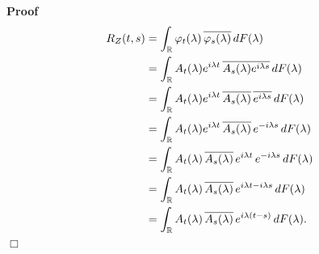 \documentclass{article}
\newenvironment{proof}{\noindent\textbf{Proof\ }}{\hspace*{\fill}$\Box$\medskip}
\begin{document}
\begin{proof}
  \begin{align*}
    R_Z (t, s) & = \int_{\mathbb{R}} \varphi_t (\lambda) \hspace{0.17em}
    \overline{\varphi_s (\lambda)} \hspace{0.17em} dF (\lambda)\\
    & = \int_{\mathbb{R}} A_t (\lambda) e^{i \lambda t} \hspace{0.17em}
    \overline{A_s (\lambda) e^{i \lambda s}} \hspace{0.17em} dF (\lambda)\\
    & = \int_{\mathbb{R}} A_t (\lambda) e^{i \lambda t} \hspace{0.17em}
    \overline{A_s (\lambda)} \hspace{0.17em} \overline{e^{i \lambda s}}
    \hspace{0.17em} dF (\lambda)\\
    & = \int_{\mathbb{R}} A_t (\lambda) e^{i \lambda t} \hspace{0.17em}
    \overline{A_s (\lambda)} \hspace{0.17em} e^{- i \lambda s} 
    \hspace{0.17em} dF (\lambda)\\
    & = \int_{\mathbb{R}} A_t (\lambda) \hspace{0.17em} \overline{A_s
    (\lambda)} \hspace{0.17em} e^{i \lambda t}  \hspace{0.17em} e^{- i \lambda
    s}  \hspace{0.17em} dF (\lambda)\\
    & = \int_{\mathbb{R}} A_t (\lambda) \hspace{0.17em} \overline{A_s
    (\lambda)} \hspace{0.17em} e^{i \lambda t - i \lambda s}  \hspace{0.17em}
    dF (\lambda)\\
    & = \int_{\mathbb{R}} A_t (\lambda) \hspace{0.17em} \overline{A_s
    (\lambda)} \hspace{0.17em} e^{i \lambda (t - s)}  \hspace{0.17em} dF
    (\lambda) .
  \end{align*}
\end{proof}
\end{document}
